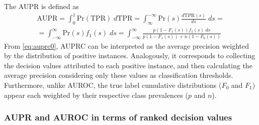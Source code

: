 The AUPR is defined as
%
\begin{multline}
    \text{AUPR}
    = \int_{0}^{1} \text{Pr}(\text{TPR}) \;d\text{TPR}
    = \int_{\infty}^{-\infty} \text{Pr}(s) \frac{d\text{TPR}(s)}{ds} \;ds
    =\\
    = \int_{-\infty}^{\infty} \text{Pr}(s) f_1(s)\;ds
    = \int_{-\infty}^{\infty} \frac{p (1 - F_1(s)) f_1(s) \;ds}{p (1 - F_1(s)) + n (1 - F_0(s))}
    \label{eq:auprc0}
\end{multline}
%
From \autoref{eq:auprc0}, AUPRC can be interpreted as the average precision weighted by the distribution of positive instances. Analogously, it corresponds to collecting the decision values attributed to each positive instance, and then calculating the average precision considering only these values as classification thresholds.
Furthermore, unlike AUROC, the true label cumulative distributions ($F_0$ and $F_1$) appear each weighted by their respective class prevalences ($p$ and $n$).

%


\subsubsection{AUPR and AUROC in terms of ranked decision values}
\label{sec:metrics from ranks}

